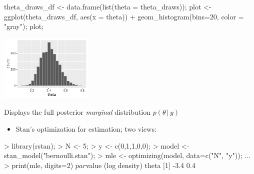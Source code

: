 \documentclass[10pt]{report}
\begin{document}
%
\begin{codein}
theta_draws_df <- data.frame(list(theta = theta_draws));
plot <-
  ggplot(theta_draws_df, aes(x = theta)) +
  geom_histogram(bins=20, color = "gray");
plot;
\end{codein}
\vspace*{-9pt}
\begin{center}
\includegraphics[height=1.25in]{img/bern-posterior-histogram.pdf}
\end{center}
\vspace*{-0.1in}
\begin{subitemize}
\item
Displays the full posterior {\slshape marginal} distribution $p(\theta \,
| \, y)$
\end{subitemize}



%
\begin{itemize}
\item Stan's optimization for estimation; two views:
\end{itemize}
\vspace*{-6pt}
\begin{stancode}
> library(rstan);
> N <- 5;
> y <- c(0,1,1,0,0);
> model <- stan_model("bernoulli.stan");
> mle <- optimizing(model, data=c("N", "y"));
...
> print(mle, digits=2)
$par              $value  (log density)
theta             [1] -3.4
  0.4
\end{stancode}
\end{document}
